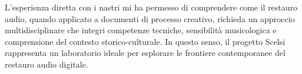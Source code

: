 L'esperienza diretta con i nastri mi ha permesso di comprendere come il restauro audio, quando applicato a documenti di processo creativo, richieda un approccio multidisciplinare che integri competenze tecniche, sensibilità musicologica e comprensione del contesto storico-culturale. In questo senso, il progetto Scelsi rappresenta un laboratorio ideale per esplorare le frontiere contemporanee del restauro audio digitale.


